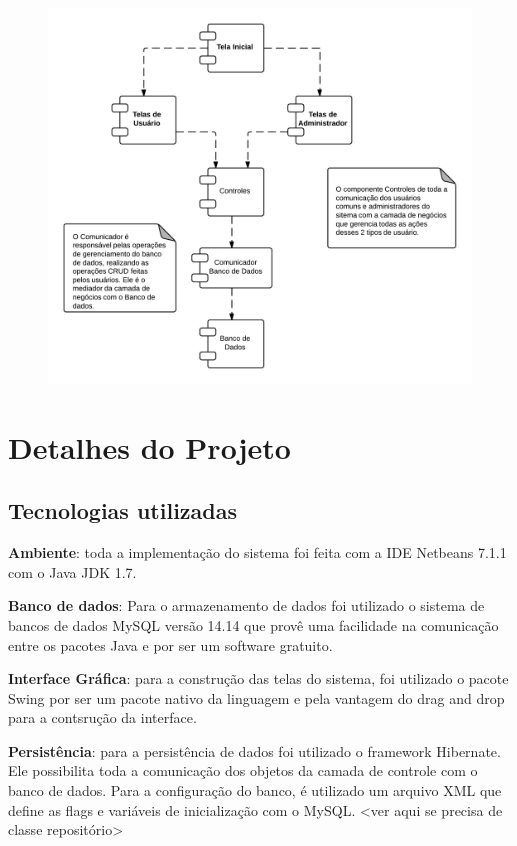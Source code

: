 \documentclass[a4paper,10pt]{article}
\begin{document}
\begin{figure}[H]
\centering
\includegraphics[width=1\textwidth]{pic/componentes.png}
\end{figure}

\section{Detalhes do Projeto}

\subsection{Tecnologias utilizadas}

\textbf{Ambiente}: toda a implementação do sistema foi feita com a IDE Netbeans 7.1.1 com o Java JDK 1.7.

\textbf{Banco de dados}: Para o armazenamento de dados foi utilizado o sistema de bancos de dados MySQL versão 14.14 que provê uma facilidade na comunicação entre os pacotes Java e por ser um software gratuito.

\textbf{Interface Gráfica}: para a construção das telas do sistema, foi utilizado o pacote Swing por ser um pacote nativo da linguagem e pela vantagem do drag and drop para a contsrução da interface.

\textbf{Persistência}: para a persistência de dados foi utilizado o framework Hibernate. Ele possibilita toda a comunicação dos objetos da camada de controle com o banco de dados. Para a configuração do banco, é utilizado um arquivo XML que define as flags e variáveis de inicialização com o MySQL. <ver aqui se precisa de classe repositório>
\end{document}
